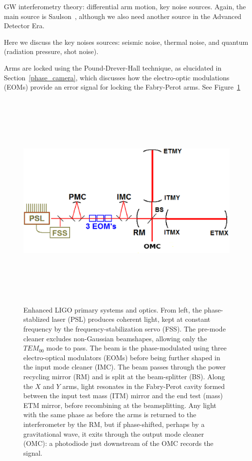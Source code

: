                 GW interferometry theory: differential arm motion, key noise sources. Again, the main source is Saulson~\cite{Saulson}, although we also need another source in the Advanced Detector Era.

                Here we discuss the key noises sources: seismic noise, thermal noise, and quantum (radiation pressure, shot noise).

                Arms are locked using the Pound-Drever-Hall technique, as elucidated in Section~\ref{phase_camera}, which discusses how the electro-optic modulations (EOMs) provide an error signal for locking the Fabry-Perot arms.
See Figure~\ref{primary_eLIGO_optics}

\begin{figure}
\begin{center}
\includegraphics[height=111mm,width=148mm]{LIGODiagramnew.eps}
\caption{Enhanced LIGO primary systems and optics. From left, the phase-stablized laser (PSL) produces coherent light, kept at constant frequency by the frequency-stabilization servo (FSS). The pre-mode cleaner excludes non-Gaussian beamshapes, allowing only the $TEM_{00}$ mode to pass. The beam is the phase-modulated using three electro-optical modulators (EOMs) before being further shaped in the input mode cleaner (IMC). The beam passes through the power recycling mirror (RM) and is split at the beam-splitter (BS). Along the $X$ and $Y$ arms, light resonates in the Fabry-Perot cavity formed between the input test mass (ITM) mirror and the end test (mass) ETM mirror, before recombining at the beamsplitting. Any light with the same phase as before the arms is returned to the interferometer by the RM, but if phase-shifted, perhaps by a gravitational wave, it exits through the output mode cleaner (OMC): a photodiode just downstream of the OMC records the signal.}
\label{primary_eLIGO_optics}
\end{center}
\end{figure}

